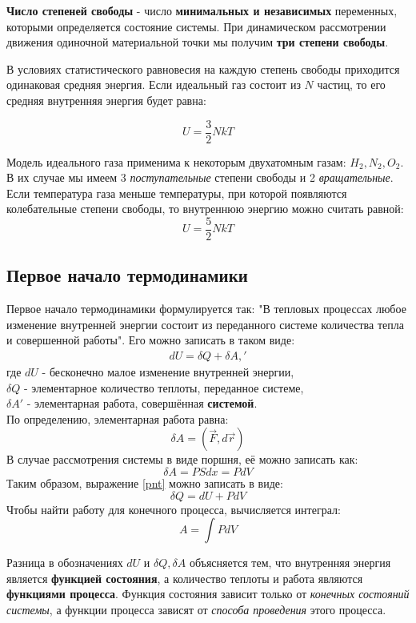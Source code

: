 \documentclass[a4paper,12pt]{article}
\begin{document}
\textbf{Число степеней свободы} - число \textbf{минимальных и независимых} переменных, которыми определяется состояние системы. При динамическом рассмотрении движения одиночной материальной точки мы получим \textbf{три степени свободы}.

В условиях статистического равновесия на каждую степень свободы приходится одинаковая средняя энергия. Если идеальный газ состоит из $N$ частиц, то его средняя внутренняя энергия будет равна:

\begin{equation}
U = \frac{3}{2}NkT
\end{equation}

Модель идеального газа применима к некоторым двухатомным газам: $H_2, N_2, O_2$. В их случае мы имеем 3 \textit{поступательные} степени свободы и 2 \textit{вращательные}. Если температура газа меньше температуры, при которой появляются колебательные степени свободы, то внутреннюю энергию можно считать равной:
\begin{equation}
U = \frac{5}{2}NkT
\end{equation}

\subsection{Первое начало термодинамики}
Первое начало термодинамики формулируется так: "В тепловых процессах любое изменение внутренней энергии состоит из переданного системе количества тепла и совершенной работы". Его можно записать в таком виде:
\begin{eqnarray}\label{pnt}
dU = \delta Q + \delta A,'
\end{eqnarray}
где $dU$ - бесконечно малое изменение внутренней энергии, \\$\delta Q$ - элементарное количество теплоты, переданное системе,\\ $\delta A'$ - элементарная работа, совершённая \textbf{системой}.\\
По определению, элементарная работа равна:
$$\delta A = (\vec{F}, d\vec{r})$$
В случае рассмотрения системы в виде поршня, её можно записать как:
$$\delta A = PSdx = PdV$$
Таким образом, выражение \eqref{pnt} можно записать в виде:
\begin{equation}
\delta Q = dU + PdV
\end{equation}
Чтобы найти работу для конечного процесса, вычисляется интеграл:
$$A = \int PdV$$

Разница в обозначениях $dU$ и $\delta Q, \delta A$ объясняется тем, что внутренняя энергия является \textbf{функцией состояния}, а количество теплоты и работа являются \textbf{функциями процесса}. Функция состояния зависит только от \textit{конечных состояний системы}, а функции процесса зависят от  \textit{способа проведения} этого процесса.
\end{document}

